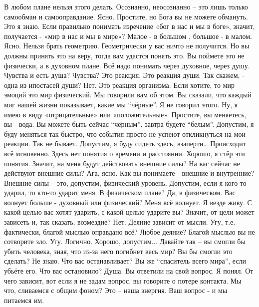 \documentclass{extbook}
\newcommand{\soul}[1]{{#1}}
\newcommand{\people}[1]{{#1}}
\begin{document}
\soul{В любом плане нельзя этого делать. Осознанно, неосознанно – это лишь только самообман и самооправдание.}
\people{Ясно.}
\soul{Простите, но Бога вы не можете обмануть.}
\people{Это я знаю. Если правильно понимать изречение «бог в нас и мы в боге», значит, получается - «мир в нас и мы в мире»?}
\soul{Малое - в большом ,  большое - в малом.}
\people{Ясно.}
\soul{Нельзя брать геометрию. Геометрически у вас ничто не получится. Но вы должны принять это на веру, тогда вам удастся понять это. Вы поймете это не физически, а в духовном плане.  Всё надо понимать через духовное, через душу.}
\people{Чувства и есть душа? Чувства?}
\soul{Это реакция. Это реакция души.}
\people{Так скажем, -  одна из ипостасей души?}
\soul{ Нет. Это реакция организма. Если хотите, то мир эмоций это мир физический. Мы говорили вам об этом.}
\people{Вы сказали, что каждый миг нашей жизни показывает,  какие мы ``чёрные''.}
\soul{Я не говорил этого.}
\people{Ну, я имею в виду «отрицательные» или «положительные».}
\soul{Простите, вы меняетесь, вы - вода. Вы можете быть сейчас ``чёрным'', завтра будете ``белым''.}
\people{Допустим, я буду меняться так быстро, что события просто не успеют откликнуться на мои реакции.}
\soul{Так не бывает.}
\people{Допустим, я буду сидеть здесь, взаперти…}
\soul{Происходит всё мгновенно. Здесь нет понятия о времени и расстоянии.}
\people{Хорошо, я стёр эти понятия. Значит, на меня будут действовать внешние силы?}
\soul{На вас сейчас не действуют внешние силы?}
\people{Ага, ясно.}
\soul{Как вы понимаете - внешние и внутренние?}
\people{Внешние силы – это, допустим,  физический уровень. Допустим, если я кого-то ударил, то кто-то ударит меня.}
\soul{В физическом плане?}
\people{Да, в физическом.}
\soul{Вас волнует больше - духовный или физический?}
\people{Меня всё волнует. Я везде живу.}
\soul{С какой целью вас хотят ударить, с какой целью ударите вы?}
\people{Значит, от цели может зависеть и, так сказать, возмездие?}
\soul{Нет. Деяние зависит от мысли.}
\people{Угу, т.е. фактически, благой мыслью оправдано всё? Любое деяние?}
\soul{Благой мыслью вы не сотворите зло.}
\people{Угу. Логично. Хорошо, допустим...}
\soul{Давайте так – вы смогли бы убить человека, зная, что из-за него погибнет весь мир? Вы бы смогли это сделать?}
\people{Не знаю.}
\soul{Что вас останавливает? Вы же ``спаситель всего мира'', если убьёте его. Что вас остановило?}
\people{Душа.}
\soul{Вы ответили на свой вопрос.}
\people{Я понял.}
\people{ От чего зависит, вот если я не задам вопрос, вы говорите о потере контакта. Мы что, сливаемся с общим фоном?}
\soul{Это – наша энергия. Ваш вопрос - и мы питаемся им.}
\end{document}
